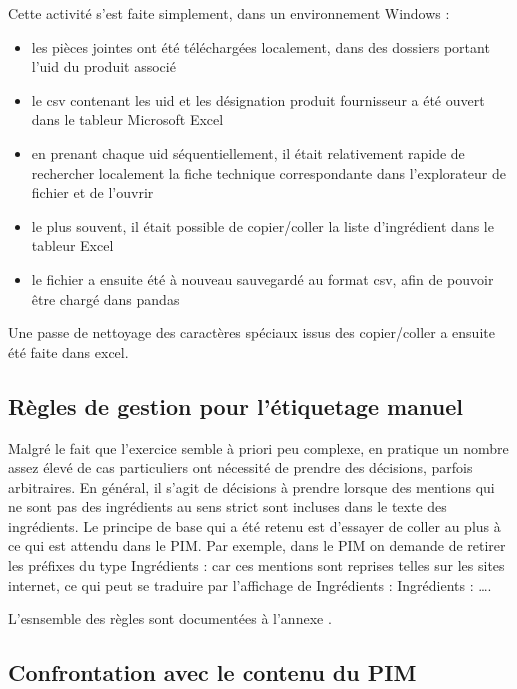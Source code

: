             Cette activité s'est faite simplement, dans un environnement Windows : 
            \begin{itemize}
                \item les pièces jointes ont été téléchargées localement, dans des dossiers portant l'uid du produit associé
                \item le csv contenant les uid et les désignation produit fournisseur a été ouvert dans le tableur Microsoft Excel
                \item en prenant chaque uid séquentiellement, il était relativement rapide de rechercher localement la fiche technique correspondante dans l'explorateur de fichier et de l'ouvrir
                \item le plus souvent, il était possible de copier/coller la liste d'ingrédient dans le tableur Excel
                \item le fichier a ensuite été à nouveau sauvegardé au format csv, afin de pouvoir être chargé dans pandas
            \end{itemize}
            Une passe de nettoyage des caractères spéciaux issus des copier/coller a ensuite été faite dans excel.

            \subsection{Règles de gestion pour l'étiquetage manuel}
        
            Malgré le fait que l'exercice semble à priori peu complexe, en pratique un nombre assez élevé de cas particuliers ont nécessité de prendre des décisions, parfois arbitraires.
            En général, il s'agit de décisions à prendre lorsque des mentions qui ne sont pas des ingrédients au sens strict sont incluses dans le texte des ingrédients.
            Le principe de base qui a été retenu est d'essayer de coller au plus à ce qui est attendu dans le PIM. 
            Par exemple, dans le PIM on demande de retirer les préfixes du type \og Ingrédients : \fg car ces mentions sont reprises telles sur les sites internet, ce qui peut se traduire par l'affichage de \og Ingrédients : Ingrédients : \dots \fg.

            L'esnsemble des règles sont documentées à l'annexe .

            \subsection{Confrontation avec le contenu du PIM}
            
